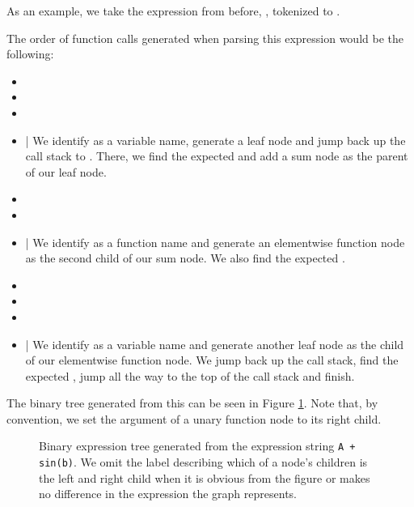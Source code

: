 \documentclass[12pt, a4paper]{report} %
\begin{document}
As an example, we take the expression from before, , tokenized to .

The order of function calls generated when parsing this expression would be the following:
\FloatBarrier
\begin{itemize}
    \setlength\itemsep{0.01em}
    \item {}
    \item {}
    \item {}
    \item {} | We identify  as a variable name, generate a leaf node and jump back up the call stack to . There, we find the expected  and add a sum node as the parent of our leaf node.
    \item {}
    \item {}
    \item {} | We identify  as a function name and generate an elementwise function node as the second child of our sum node. We also find the expected .
    \item {}
    \item {}
    \item {}
    \item {} | We identify  as a variable name and generate another leaf node as the child of our elementwise function node. We jump back up the call stack, find the expected , jump all the way to the top of the call stack and finish.
\end{itemize}
\FloatBarrier
The binary tree generated from this can be seen in Figure \ref{fig:tree_example}.
Note that, by convention, we set the argument of a unary function node to its right child.

\begin{figure}
    \centering
    \caption[Example of Binary Tree Generated from an Expression]{Binary expression tree generated from the expression string \texttt{A + sin(b)}. We omit the label describing which of a node's children is the left and right child when it is obvious from the figure or makes no difference in the expression the graph represents.}
    \label{fig:tree_example}
\end{figure}
\end{document}
